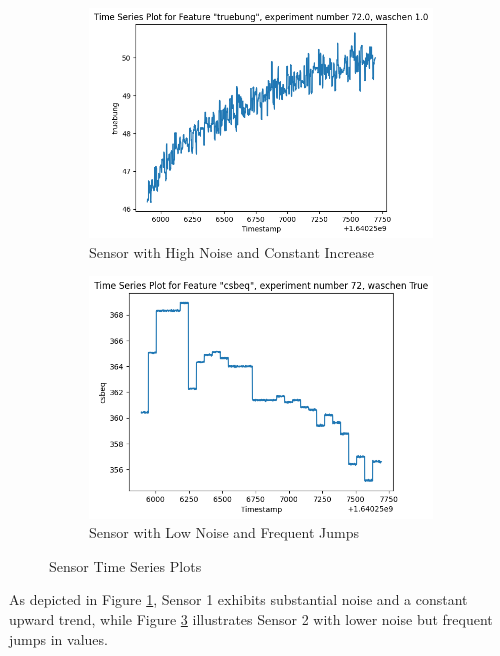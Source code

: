 \documentclass{report}
\begin{document}
\begin{figure}[htbp]
    \begin{subfigure}{0.45\textwidth}
        \centering
        \includegraphics[width=\linewidth]{sensor_noisy_plot.png}
        \caption{Sensor with High Noise and Constant Increase}
        \label{fig:sensor_noisy}
    \end{subfigure}
    \hfill
    \begin{subfigure}{0.45\textwidth}
        \centering
        \includegraphics[width=\linewidth]{sensor_stable_plot.png}
        \caption{Sensor with Low Noise and Frequent Jumps}
        \label{fig:sensor_stable}
    \end{subfigure}
    \caption{Sensor Time Series Plots}
\end{figure}

As depicted in Figure \ref{fig:sensor_noisy}, Sensor 1 exhibits substantial noise and a constant upward trend, while Figure \ref{fig:sensor_stable} illustrates Sensor 2 with lower noise but frequent jumps in values.
\end{document}
